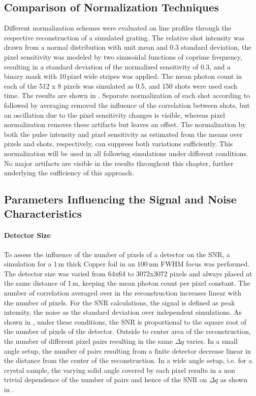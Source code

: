 \subsection{Comparison of Normalization Techniques}
Different normalization schemes were evaluated on line profiles through the respective reconstruction of a simulated grating. The relative shot intensity was drawn from a normal distribution with unit mean and 0.3 standard deviation, the pixel sensitivity was modeled by two sinusoidal functions of coprime frequency, resulting in a standard deviation of the normalized sensitivity of 0.3, and a binary mask with 10\,pixel wide stripes was applied. The mean photon count in each of the 512 x 8 pixels was simulated as 0.5, and 150 shots were used each time. The results are shown in .
Separate normalization of each shot according to   followed by averaging removed the influence of the correlation between shots, but an oscillation due to the pixel sensitivity changes is visible, whereas pixel normalization removes these artifacts but leaves an offset. The normalization by both the pulse intensity and pixel sensitivity as estimated from the means over pixels and shots, respectively, can suppress both variations sufficiently. This normalization will be used in all following simulations under different conditions. No major artifacts are visible in the results throughout this chapter, further underlying the sufficiency of this approach.

\subsection{Parameters Influencing the Signal and Noise Characteristics}
\paragraph{Detector Size}
	
To assess the influence of the number of pixels of a detector on the SNR, a simulation for a 1\,\textmu m thick Copper foil in an 100\,nm FWHM focus was performed. The detector size was varied from 64x64 to 3072x3072 pixels and always placed at the same distance of 1\,m, keeping the mean photon count per pixel constant. The number of correlation averaged over in the reconstruction increases linear with the number of pixels. For the SNR calculations, the signal is defined as peak intensity, the noise as the standard deviation over independent simulations.  As shown in , under these conditions, the SNR is proportional to the square root of the number of pixels of the detector. 
Outside to center area of the reconstruction, the number of different pixel pairs resulting in the same $\Delta{q}$ varies. In a small angle setup, the number of pairs resulting from a finite detector decrease linear in the distance from the center of the reconstruction. In a wide angle setup, i.e. for a crystal sample, the varying solid angle covered by each pixel results in a non trivial dependence of the number of pairs and hence of the SNR on $\Delta{q}$ as shown in .




